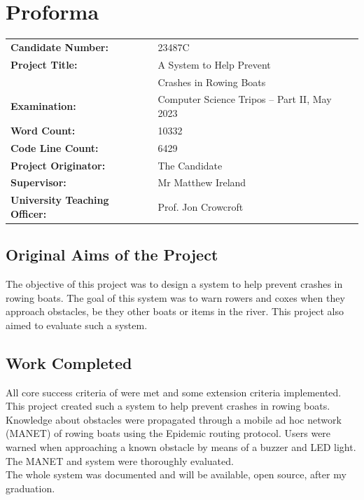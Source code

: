 \documentclass[12pt,a4paper]{report}
\begin{document}
\chapter*{Proforma}

{\large
\begin{tabular}{ll}
\bf Candidate Number:   & 23487C \\
\bf Project Title:  & A System to Help Prevent \\
& Crashes in Rowing Boats \\
\bf Examination:  & Computer Science Tripos -- Part II, May 2023      \\
\bf Word Count:    & 10332 \footnotemark[1]   \\
\bf Code Line Count:    & 6429 \footnotemark[2] \\ 
\bf Project Originator: & The Candidate     \\
\bf Supervisor:         & Mr Matthew Ireland  \\ 
\bf University Teaching Officer:  & Prof. Jon Crowcroft \\ 
\end{tabular}
}


\section*{Original Aims of the Project}
The objective of this project was to design a system to help prevent crashes in rowing boats. The goal of this system was to warn rowers and coxes when they approach obstacles, be they other boats or items in the river. This project also aimed to evaluate such a system.

\section*{Work Completed}
All core success criteria of were met and some extension criteria implemented. \\ 
This project created such a system to help prevent crashes in rowing boats. Knowledge about obstacles were propagated through a mobile ad hoc network (MANET) of rowing boats using the Epidemic routing protocol. Users were warned when approaching a known obstacle by means of a buzzer and LED light. The MANET and system were thoroughly evaluated. \\
The whole system was documented and will be available, open source, after my graduation. \\ 
\end{document}
